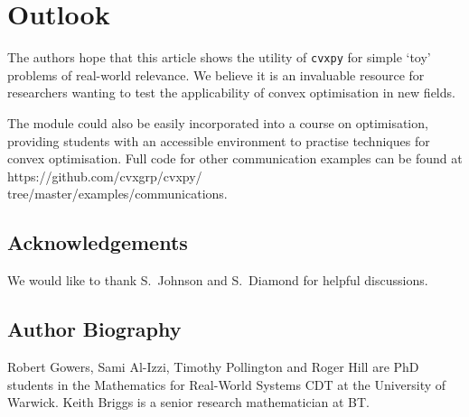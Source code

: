 \documentclass[twocolumn,secnumarabic,amssymb, nobibnotes, aps, prl,superscriptaddress]{revtex4-1}
\begin{document}
\section{Outlook}
\noindent The authors hope that this article shows the utility of \texttt{cvxpy} for simple `toy' problems of real-world relevance. We believe it is an invaluable resource for researchers wanting to test the applicability of convex optimisation in new fields. 

The module could also be easily incorporated into a course on optimisation, providing students with an accessible environment to practise techniques for convex optimisation. Full code for other communication examples can be found at https://github.com/cvxgrp/cvxpy/\\tree/master/examples/communications.



\subsection*{Acknowledgements}
We would like to thank S.~Johnson and S.~Diamond for helpful discussions. 

\subsection*{Author Biography}
Robert Gowers, Sami Al-Izzi, Timothy Pollington and Roger Hill are PhD students in the Mathematics for Real-World Systems CDT at the University of Warwick.  Keith Briggs is a senior research mathematician at BT.

\vspace{0.2cm}
 


\end{document}

